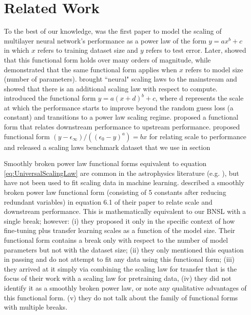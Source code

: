 \section{Related Work}
To the best of our knowledge,\citet{cortes1994learning} was the first paper to model the scaling of multilayer neural network's performance as a power law 
of the form $y=ax^b + c$ in which $x$ refers to training dataset size and $y$ refers to test error.
Later, \citet{2017arXiv171200409H} showed that this functional form holds over many orders of magnitude, while \citet{DBLP:journals/corr/abs-1909-12673} demonstrated  that the same functional form applies when $x$ refers to model size (number of parameters). \citet{icm2020arXiv200108361K} brought ``neural" scaling laws to the mainstream and showed that there is an additional scaling law with respect to compute. \citet{DBLP:journals/corr/abs-2106-04560} introduced the functional form $y=a(x+d)^b + c$, where  d represents the scale at which the performance starts to improve beyond the  random guess loss (a constant) and transitions to a  power law scaling regime. \citet{abnar2021exploring} proposed a functional form that relates downstream performance to upstream performance. \citet{Alabdulmohsi2022revisiting} proposed functional form $(y - \epsilon_{\infty}) / ((\epsilon_{0} - y)^a) = bx$ for relating scale to performance and released a scaling laws benchmark dataset that we use in section 


Smoothly broken power law functional forms equivalent to equation \ref{eq:UniversalScalingLaw} are common in the astrophysics literature (e.g. \cite{dampe2017direct}), but have not been used to fit scaling data in machine learning.
\citet{brown2020language}
described a smoothly broken power law functional form (consisting of 5 constants after reducing redundant variables) in equation 6.1 of their paper to relate scale and downstream performance. 
This is mathematically equivalent to our BNSL with a single break; however: (i) they proposed it only in the specific context of how fine-tuning plus transfer learning scales as a function of the model size. Their functional form contains a break only with respect to the number of model parameters but not with the dataset size; (ii) they only mentioned this equation in passing and do not attempt to fit any data using this functional form; (iii) they arrived at it simply via combining the scaling law for transfer that is the focus of their work with a scaling law for pretraining data, (iv) they did not identify it as a smoothly broken power law, or note any qualitative advantages of this functional form. (v) they do not talk about the family of functional forms with multiple breaks. 

